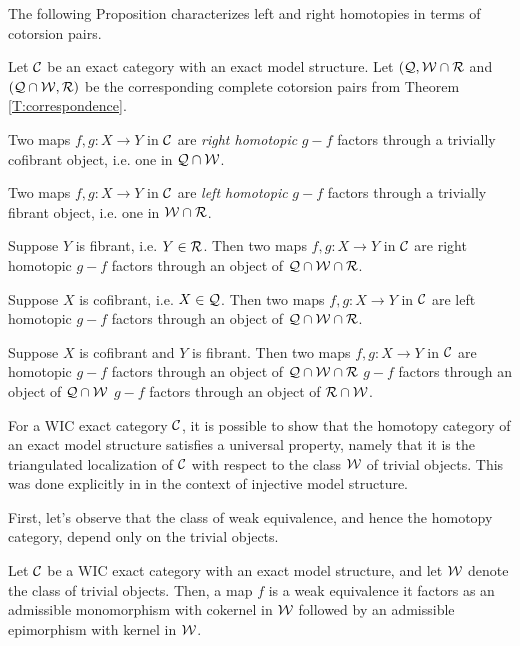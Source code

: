The following Proposition characterizes left and right homotopies in terms of cotorsion pairs.

\begin{prop}{\cite[Proposition~2.5]{G7}}\label{prop:gil_homotopy}
  Let $\mathcal{C}$ be an exact category with an exact model structure. Let $(\mathcal{Q},\mathcal{W}\cap\mathcal{R}$ and $(\mathcal{Q}\cap\mathcal{W},\mathcal{R})$ be the corresponding complete cotorsion pairs from Theorem \ref{T:correspondence}.
  \begin{enumerate}[label=(\arabic*)]
    \item Two maps $f,g:X\to Y$ in $\mathcal{C}$ are \emph{right homotopic} \iff $g-f$ factors through a trivially cofibrant object, i.e. one in $\mathcal{Q}\cap\mathcal{W}$.
    \item Two maps $f,g:X\to Y$ in $\mathcal{C}$ are \emph{left homotopic} \iff $g-f$ factors through a trivially fibrant object, i.e. one in $\mathcal{W}\cap\mathcal{R}$.
    \item Suppose $Y$ is fibrant, i.e. $Y\in \mathcal{R}$. Then two maps $f,g:X\to Y$ in $\mathcal{C}$ are right homotopic \iff $g-f$ factors through an object of $\mathcal{Q}\cap\mathcal{W}\cap\mathcal{R}$.
    \begin{sloppypar}
      \item Suppose $X$ is cofibrant, i.e. $X\in\mathcal{Q}$. Then two maps ${f,g:X\to Y}$ in $\mathcal{C}$ are left homotopic \iff $g-f$ factors through an object of $\mathcal{Q}\cap\mathcal{W}\cap\mathcal{R}$.
    \end{sloppypar}
    \begin{sloppypar}
      \item\label{prop:gil_homotopy.5} Suppose $X$ is cofibrant and $Y$ is fibrant. Then two maps ${f,g:X\to Y}$ in $\mathcal{C}$ are homotopic \iff $g-f$ factors through an object of $\mathcal{Q}\cap\mathcal{W}\cap\mathcal{R}$ \iff $g-f$ factors through an object of $\mathcal{Q}\cap\mathcal{W}$ \iff $g-f$ factors through an object of $\mathcal{R}\cap\mathcal{W}$.
    \end{sloppypar}
  \end{enumerate}
\end{prop}

For a WIC exact category $\mathcal{C}$, it is possible to show that the homotopy category of an exact model structure satisfies a universal property, namely that it is the triangulated localization of $\mathcal{C}$ with respect to the class $\mathcal{W}$ of trivial objects. This was done explicitly in \cite{G7} in the context of injective model structure.

First, let's observe that the class of weak equivalence, and hence the homotopy category, depend only on the trivial objects.

\begin{lem}{\cite[Lemma~3.1]{G7}}
  Let $\mathcal{C}$ be a WIC exact category with an exact model structure, and let $\mathcal{W}$ denote the class of trivial objects. Then, a map $f$ is a weak equivalence \iff it factors as an admissible monomorphism with cokernel in $\mathcal{W}$ followed by an admissible epimorphism with kernel in $\mathcal{W}$.
\end{lem}

